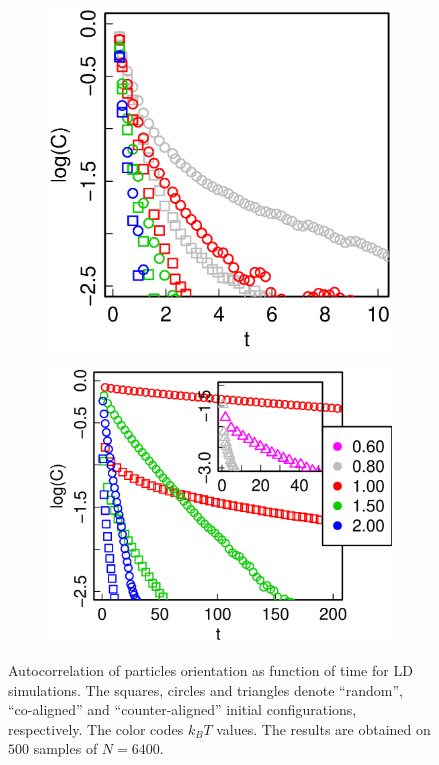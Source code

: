 \begin{figure}[t]
\centering
	\begin{subfigure}[t]{0.32\textwidth}
		\centering
		\includegraphics[width=\textwidth]{Images/Autocors_25}
	\end{subfigure}
	\begin{subfigure}[t]{0.375\textwidth}
		\centering
		\includegraphics[width=\textwidth]{Images/Autocors_75}
	\end{subfigure}
	\captionsetup{justification=centering, width=0.9\columnwidth}
	\caption{Autocorrelation of particles orientation as function of time for LD simulations. The squares, circles and triangles denote ``random'', ``co-aligned'' and ``counter-aligned'' initial configurations, respectively. The color codes $k_BT$ values. The results are obtained on $500$ samples of $N = 6400$.}
	\label{fig:autocorrelation}
\end{figure}


